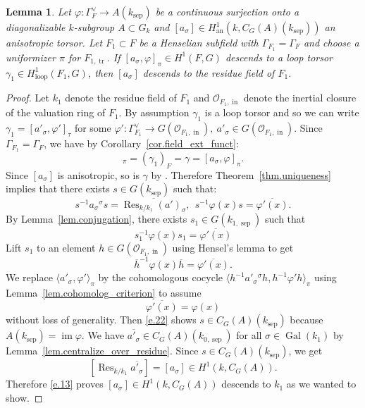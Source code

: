 \documentclass[12pt]{amsart}
\numberwithin{equation}{section}
\newtheorem{lemma}[theorem]{Lemma}
\theoremstyle{definition}
\newcommand{\cO}{\mathcal{O}}
\newcommand{\an}{\operatorname{an}}
\newcommand{\im}{\operatorname{im}}
\newcommand{\Gal}{\operatorname{Gal}}
\newcommand{\sep}{\operatorname{sep}}
\newcommand{\tr}{\operatorname{tr}}
\newcommand{\Inf}{\operatorname{Res}}
\newcommand{\ksep}{k_{\sep}}
\newcommand{\oin}{\operatorname{in}}
\newcommand{\vphi}{\varphi}
\newcommand{\I}[1]{\Gamma_{#1}^{\vee}}
\newcommand{\lop}{\operatorname{loop}}
\begin{document}
\begin{lemma}\label{lem.descent}
    Let $\vphi: \I{F}\to A(\ksep)$ be a continuous surjection onto a diagonalizable $k$-subgroup $A\subset G_k$ and $[a_\sigma]\in H^1_{\an}(k,C_G(A)(\ksep))$ an anisotropic torsor. Let $F_1 \subset F$ be a Henselian subfield with $\Gamma_{F_1} = \Gamma_F$ and choose a uniformizer $\pi$ for $F_{1,\tr}$.  If $[a_\sigma,\vphi]_\pi\in H^1(F,G)$ descends to a loop torsor $\gamma_1 \in H^1_{\lop}(F_1,G)$, then $[a_\sigma]$ descends to the residue field of $F_1$.
\end{lemma}
\begin{proof}
   
    Let $k_1$ denote the residue field of $F_1$ and $\cO_{F_1,\oin}$ denote the inertial closure of the valuation ring of $F_1$. By assumption $\gamma_1$ is a loop torsor and so we can write $\gamma_1=[a'_\sigma,\vphi']_{\tau}$ for some $\vphi': \I{F_1}\to G(\cO_{F_1,\oin}), \ a'_\sigma\in G(\cO_{F_1,\oin})$. Since $\Gamma_{F_1} = \Gamma_F$, we have by Corollary~\ref{cor.field_ext_funct}:
    \begin{equation*}
        [\Inf_{k/k_1}(a')_\sigma, \vphi']_\pi = (\gamma_1)_F = \gamma = [a_\sigma,\vphi]_\pi.
    \end{equation*}
   Since $[a_\sigma]$ is anisotropic, so is $\gamma$ by \cite[Proposition 4.9]{gille2024newloop}. Therefore Theorem~\ref{thm.uniqueness} implies that there exists $s\in G(\ksep)$ such that: %
    \begin{equation}\label{e.22}
       s^{-1} a_\sigma {}^{\sigma} s = \overline{\Inf_{k/k_1}(a')_\sigma}, \ \ s^{-1} {\vphi(x)} s = \overline{\vphi'(x)}.
    \end{equation}
    By Lemma~\ref{lem.conjugation}, there exists $s_1 \in G(k_{1,\sep})$ such that
    $$s_1^{-1} {\vphi(x)} s_1 = \overline{\vphi'(x)}$$
    Lift $s_1$ to an element $h \in G(\cO_{F_1,\oin})$ using Hensel's lemma to get $$\overline{h}^{-1}\vphi(x)\overline{h} = \overline{\vphi'(x)}.$$ We replace $\langle a'_\sigma,\vphi'\rangle_\pi$ by the cohomologous cocycle $\langle h^{-1}a'_\sigma {}^\sigma h, h^{-1}\vphi'h\rangle_\pi$ using Lemma~\ref{lem.cohomolog_criterion} to assume $$\overline{\vphi'(x)} = {\vphi(x)}$$ without loss of generality. 
    Then \eqref{e.22} shows $s \in C_G(A)(\ksep)$ because $A(\ksep) = \im \vphi$. 
    We have $\overline{a'_\sigma}\in C_G(A)(k_{0,\sep})$ for all $\sigma\in \Gal(k_1)$ by Lemma~\ref{lem.centralize_over_residue}. Since $s \in C_G(A)(\ksep)$, we get
    \begin{equation}\label{e.13}
        [\Inf_{k/k_1}\overline{a'_\sigma}] =[a_\sigma] \in H^1(k,C_G(A)).
    \end{equation}
    Therefore \eqref{e.13} proves $[a_\sigma] \in H^1(k,C_G(A))$ descends to $k_1$ as we wanted to show.
\end{proof}
\end{document}
